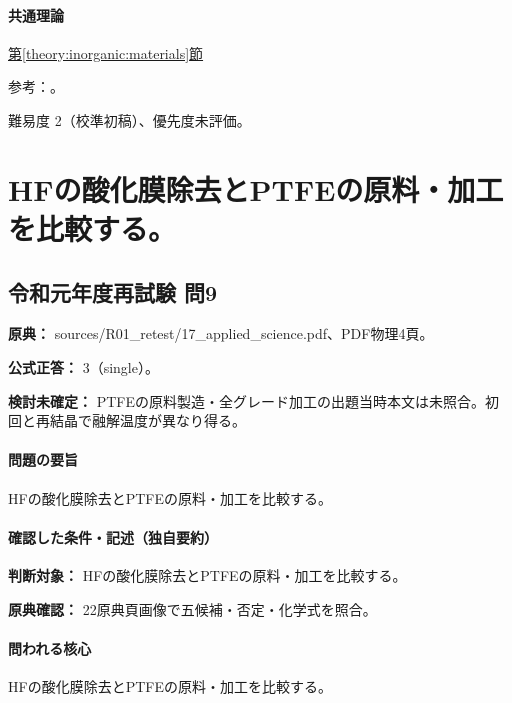 \paragraph{共通理論} \hyperref[theory:inorganic:materials]{第\ref*{theory:inorganic:materials}節}

\par 参考：\cite{inorganic_blueled,inorganic_rareuses,inorganic_searesources}。

\par 難易度 2（校準初稿）、優先度未評価。

\section{HFの酸化膜除去とPTFEの原料・加工を比較する。}

\subsection{令和元年度再試験 問9}
\label{q:r01-ret-applied-09}

\noindent\textbf{原典：} sources/R01\_retest/17\_applied\_science.pdf、PDF物理4頁。

\textbf{公式正答：} 3（single）。

\par\textbf{検討未確定：} PTFEの原料製造・全グレード加工の出題当時本文は未照合。初回と再結晶で融解温度が異なり得る。

\paragraph{問題の要旨} HFの酸化膜除去とPTFEの原料・加工を比較する。

\paragraph{確認した条件・記述（独自要約）}\mbox{}\par

\noindent\textbf{判断対象：} HFの酸化膜除去とPTFEの原料・加工を比較する。\par

\noindent\textbf{原典確認：} 22原典頁画像で五候補・否定・化学式を照合。\par

\paragraph{問われる核心} HFの酸化膜除去とPTFEの原料・加工を比較する。

